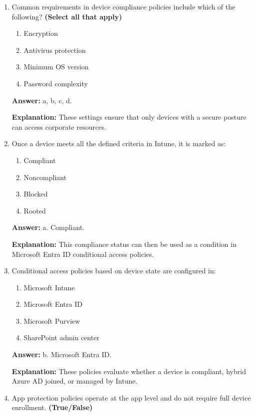 \documentclass[10pt]{article}
\begin{document}
\begin{enumerate}[leftmargin=*]
\textbf{Explanation:} These policies define the minimum security standards a device must meet to be considered trustworthy.

\item Common requirements in device compliance policies include which of the following? \textbf{(Select all that apply)}
\begin{enumerate}[label=\alph*., leftmargin=1.5em]
\item Encryption
\item Antivirus protection
\item Minimum OS version
\item Password complexity
\end{enumerate}
\textbf{Answer:} a, b, c, d.

\textbf{Explanation:} These settings ensure that only devices with a secure posture can access corporate resources.

\item Once a device meets all the defined criteria in Intune, it is marked as:
\begin{enumerate}[label=\alph*., leftmargin=1.5em]
\item Compliant
\item Noncompliant
\item Blocked
\item Rooted
\end{enumerate}
\textbf{Answer:} a. Compliant.

\textbf{Explanation:} This compliance status can then be used as a condition in Microsoft Entra ID conditional access policies.

\item Conditional access policies based on device state are configured in:
\begin{enumerate}[label=\alph*., leftmargin=1.5em]
\item Microsoft Intune
\item Microsoft Entra ID
\item Microsoft Purview
\item SharePoint admin center
\end{enumerate}
\textbf{Answer:} b. Microsoft Entra ID.

\textbf{Explanation:} These policies evaluate whether a device is compliant, hybrid Azure AD joined, or managed by Intune.

\item App protection policies operate at the app level and do not require full device enrollment. \textbf{(True/False)}


\end{enumerate}
\end{document}
